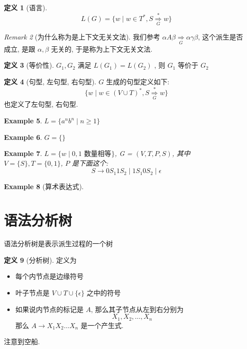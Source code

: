 \documentclass[12pt]{ctexart}
\theoremstyle{definition}
\theoremstyle{definition}
\newtheorem{definition}{定义}[section]
\theoremstyle{plain}
\newtheorem{exam}[definition]{Example}
\theoremstyle{remark}
\newtheorem{remark}[definition]{Remark}
\begin{document}
\begin{definition}[语言]
\begin{equation}
	L (G) =  \{ w \mid w \in T ^{*} , S \overset{*}{\underset{G}{\Rightarrow}} w \}
\end{equation}
\end{definition}

\begin{remark}[为什么称为是上下文无关文法]
	我们参考 \(\alpha A\beta \underset{G}{\Rightarrow}\alpha\gamma\beta\), 这个派生是否成立, 是跟 \(\alpha ,\beta\) 无关的, 于是称为上下文无关文法.
\end{remark}

\begin{definition}[等价性]
	\(G_{1} , G_{2}\) 满足 \(L (G _{1} )  =  L (G _{2} ) \) , 则 \(G_{1} \) 等价于 \(G_{2}\)
\end{definition}

\begin{definition}[句型, 左句型, 右句型]
	\(G\) 生成的句型定义如下: 
	\begin{equation}
		\{ w \mid w \in (V \cup T ) ^{*} , S \overset{*}{\underset{G}{\Rightarrow}} w \}
	\end{equation}
	也定义了左句型, 右句型.
\end{definition}


\begin{exam}
	\(L  = \{ a ^{n} b ^{n}\mid n \ge 1 \}\)
\end{exam}
\begin{exam}
	\(G = \{ \}\)
\end{exam}
\begin{exam}
	\(L = \{  w \mid 0,  1 \text{ 数量相等}\}\), G = \((V, T , P , S)\), 其中 \(V = \{ S \}, T = \{ 0 ,1 \}\), \(P \) 是下面这个:
	\[
	S \to 0S_{1} 1 S_{2} \mid 1 S_{1} 0 S_{2}  \mid \epsilon 
\]
\end{exam}

\begin{exam}[算术表达式]
\end{exam}


\section{语法分析树}\label{sec:tree}

语法分析树是表示派生过程的一个树

\begin{definition}[分析树]\label{def:分析树}
定义为 
\begin{itemize}
\item [1] 
 每个内节点是边缘符号
\item [2] 
叶子节点是 \(V \cup T \cup \{ \epsilon \} \) 之中的符号 
\item [3] 
如果说内节点的标记是 \(A\), 那么其子节点从左到右分别为
\[
X_{1} , X _{2}, \dots , X _{n}
\]
那么 \(A \to X _{1} X _{2}\dots  X_{n}\) 是一个产生式. 
\end{itemize}
注意到空船. 
\end{definition}
\end{document}
